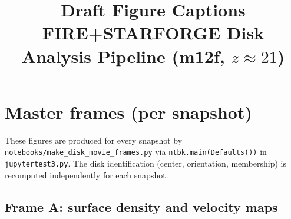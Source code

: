 \documentclass[12pt]{article}
\title{Draft Figure Captions\\[0.5em]
\large FIRE+STARFORGE Disk Analysis Pipeline (m12f, $z\approx21$)}
\author{}
\date{}
\begin{document}
\maketitle
\tableofcontents
\newpage

\section{Master frames (per snapshot)}

These figures are produced for every snapshot by \texttt{notebooks/make\_disk\_movie\_frames.py}
via \texttt{ntbk.main(Defaults())} in \texttt{jupytertest3.py}.
The disk identification (center, orientation, membership) is recomputed independently
for each snapshot.

\subsection{Frame A: surface density and velocity maps}
\end{document}
